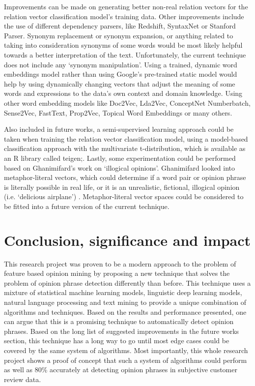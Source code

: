 \documentclass{sig-alternate}
\begin{document}
Improvements can be made on generating better non-real relation vectors for the relation vector classification model's training data. Other improvements include the use of different dependency parsers, like Redshift\cite{Honnibal2013}, SyntaxNet\cite{Alberti2017} or Stanford Parser\cite{ChenManning2014}. Synonym replacement or synonym expansion, or anything related to taking into consideration synonyms of some words would be most likely helpful towards a better interpretation of the text. Unfortunately, the current technique does not include any `synonym manipulation'. Using a trained, dynamic word embeddings model rather than using Google's pre-trained static model\cite{MikolovChenCorradoDean2013a} would help by using dynamically changing vectors that adjust the meaning of some words and expressions to the data's own context and domain knowledge. Using other word embedding models like Doc2Vec\cite{LeMikolov2014}, Lda2Vec\cite{Moody2016}, ConceptNet Numberbatch\cite{SpeerChinHavasi2017}, Sense2Vec\cite{TraskMichalakLiu2015}, FastText\cite{JoulinGraveBojanowskiMikolov2016}, Prop2Vec\cite{AvrahamGoldberg2017}, Topical Word Embeddings\cite{LiuLiuChuaSun2015} or many others.

Also included in future works, a semi-supervised learning approach could be taken when training the relation vector classification model, using a model-based classification approach with the multivariate t-distribution, which is available as an R library called teigen\cite{AndrewsMcNicholas2012};\cite{AndrewsMcNicholas2013}. 
Lastly, some experimentation could be performed based on Ghanimifard's work on `illogical opinions'. Ghanimifard\cite{Ghanimifard2017} looked into metaphor-literal vectors, which could determine if a word pair or opinion phrase is literally possible in real life, or it is an unrealistic, fictional, illogical opinion (i.e. `delicious airplane') . Metaphor-literal vector spaces could be considered to be fitted into a future version of the current technique.

\section{Conclusion, significance and impact}
This research project was proven to be a modern approach to the problem of feature based opinion mining by proposing a new technique that solves the problem of opinion phrase detection differently than before. This technique uses a mixture of statistical machine learning models, linguistic deep learning models, natural language processing and text mining to provide a unique combination of algorithms and techniques. Based on the results and performance presented, one can argue that this is a promising technique to automatically detect opinion phrases. Based on the long list of suggested improvements in the future works section, this technique has a long way to go until most edge cases could be covered by the same system of algorithms. Most importantly, this whole research project shows a proof of concept that such a system of algorithms could perform as well as 80\% accurately at detecting opinion phrases in subjective customer review data.
\end{document}
